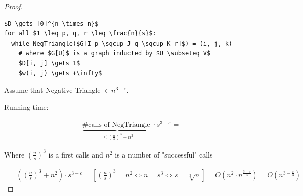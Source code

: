 \begin{proof}
	\begin{lstlisting}
$D \gets [0]^{n \times n}$
for all $1 \leq p, q, r \leq \frac{n}{s}$:
  while NegTriangle($G[I_p \sqcup J_q \sqcup K_r]$) = (i, j, k)
	# where $G[U]$ is a graph inducted by $U \subseteq V$
	$D[i, j] \gets 1$
	$w(i, j) \gets +\infty$
	\end{lstlisting}

	Assume that Negative Triangle $\in n^{3 - \varepsilon}$.

	Running time:

	\begin{align*}
		\underbrace{\text{\# calls of NegTriangle }}_{\leq (\frac{n}{s})^3 + n^2} \cdot s^{3 - \varepsilon} =
	\end{align*}

	Where $(\frac{n}{s})^3$ is a first calls and $n^2$ is a number of "successful" calls

	\begin{align*}
		=\left((\frac{n}{s})^3 + n^2\right) \cdot s^{3 - \varepsilon} = [(\frac{n}{s})^3 = n^2 \Leftrightarrow n =s^3 \Leftrightarrow s=\sqrt[3]{n}] = O(n^2 \cdot n^{\frac{3 - \varepsilon}{3}}) = O(n^{3 - \frac{\varepsilon}{3}})
	\end{align*}



\end{proof}
